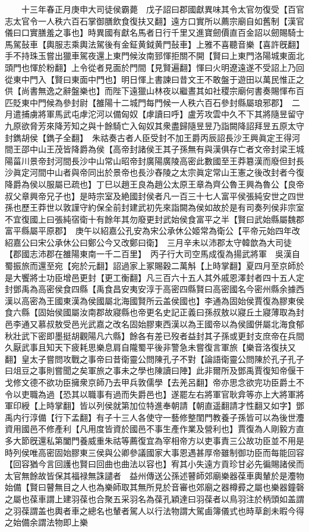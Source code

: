 　　十三年春正月庚申大司徒侯霸薨　戊子詔曰郡國獻異味其令太官勿復受【百官志太官令一人秩六百石掌御膳飲食復扶又翻】遠方口實所以薦宗廟自如舊制【漢官儀曰口實膳羞之事也】時異國有獻名馬者日行千里又進寶劒價直百金詔以劒賜騎士馬駕鼔車【輿服志乘輿法駕後有金鉦黄鉞黄門鼔車】上雅不喜聽音樂【喜許旣翻】手不持珠玉嘗出獵車駕夜還上東門候汝南郅惲拒關不開【賢曰上東門洛陽城東面北頭門也惲於粉翻】上令從者見面於門間【見賢遍翻】惲曰火明遼遠遂不受詔上乃回從東中門入【賢曰東面中門也】明日惲上書諫曰昔文王不敢盤于遊田以萬民惟正之供【尚書無逸之辭盤樂也】而陛下遠獵山林夜以繼晝其如社稷宗廟何書奏賜惲布百匹貶東中門候為參封尉【雒陽十二城門每門候一人秩六百石參封縣屬琅邪郡】　二月遣捕虜將軍馬武屯虖沱河以備匈奴【虖讀曰呼】盧芳攻雲中久不下其將隨昱留守九原欲脅芳來降芳知之與十餘騎亡入匈奴其衆盡歸隨昱昱乃詣闕降詔拜昱五原太守封鐫胡侯【鐫子全翻】　朱祜奏古者人臣受封不加王爵丙辰詔長沙王興眞定王得河間王邵中山王茂皆降爵為侯【高帝封諸侯王其子孫無有與漢俱存亡者文帝封梁王城陽菑川景帝封河間長沙中山常山昭帝封廣陽廣陵高密此數國至王莽簒漢而廢但封長沙眞定河間中山者與帝同出於景帝也長沙舂陵之太宗眞定常山王憲之後改封者今復降爵為侯以服屬已疏也】丁巳以趙王良為趙公太原王章為齊公魯王興為魯公【良帝叔父章興帝兄子也】是時宗室及絶國封侯者凡一百三十七人富平侯張純安世之四世孫也歷王莽世以敦謹守約保全前封建武初先來詣闕為侯如故於是有司奏列侯非宗室不宜復國上曰張純宿衛十有餘年其勿廢更封武始侯食富平之半【賢曰武始縣屬魏郡富平縣屬平原郡】　庚午以紹嘉公孔安為宋公承休公姬常為衛公【平帝元始四年改紹嘉公曰宋公承休公曰鄭公今又改鄭曰衛】　三月辛未以沛郡太守韓歆為大司徒【郡國志沛郡在雒陽東南一千二百里】　丙子行大司空馬成復為揚武將軍　吳漢自蜀振旅而還至宛【宛於元翻】詔過家上冢賜穀二萬斛【上時掌翻】夏四月至京師於是大饗將士功臣增邑更封【更工衡翻】凡三百六十五人其外戚恩澤封者四十五人定封鄧禹為高密侯食四縣【禹食昌安夷安淳于高密四縣賢曰高密國名今密州縣余據西漢以高密為王國東漢為侯國屬北海國賢所云盖侯國也】李通為固始侯賈復為膠東侯食六縣【固始侯國屬汝南郡故寢縣也帝更名史記正義曰孫叔敖以寢丘土寢薄取為封邑李通又慕叔敖受邑光武嘉之改名固始膠東西漢以為王國帝以為侯國併屬北海食郁秋壯武下密即墨挺胡觀陽凡六縣】餘各有差已歿者益封其子孫或更封支庶帝在兵間久厭武事且知天下疲耗思樂息肩自隴蜀平後非警急未嘗復言軍旅【樂音洛復扶又翻】皇太子嘗問攻戰之事帝曰昔衛靈公問陳孔子不對【論語衛靈公問陳於孔子孔子曰俎豆之事則嘗聞之矣軍旅之事未之學也陳讀曰陣】此非爾所及鄧禹賈復知帝偃干戈修文德不欲功臣擁衆京師乃去甲兵敦儒學【去羌呂翻】帝亦思念欲完功臣爵土不令以吏職為過【恐其以職事有過而失爵邑也】遂罷左右將軍官耿弇等亦上大將軍將軍印綬【上時掌翻】皆以列侯就第加位特進奉朝請【朝直遥翻請才性翻又如字】鄧禹内行淳備【行下孟翻】有子十三人各使守一藝修整閨門教養子孫皆可以為後世灋資用國邑不修產利【凡用度皆資於國邑不事生產作業及營利也】賈復為人剛毅方直多大節旣還私第闔門養威重朱祜等薦復宜為宰相帝方以吏事責三公故功臣並不用是時列侯唯高密固始膠東三侯與公卿參議國家大事恩遇甚厚帝雖制御功臣而每能回容【回容猶今言回護也賢曰回曲也曲法以容也】宥其小失遠方貢珍甘必先徧賜諸侯而太官無餘故皆保其福禄無誅譴者　益州傳送公孫述瞽師郊廟樂器葆車輿輦於是灋物始備【賢曰瞽無目之人也為樂師取其無所見於音審也郊廟之器樽彛之屬也樂器鐘磬之屬也葆車謂上建羽葆也合聚五采羽名為葆孔穎達曰羽葆者以鳥羽注於柄頭如盖謂之羽葆謂盖也輿者車之總名也輦者駕人以行法物謂大駕鹵簿儀式也時草創未暇今得之始備余謂法物即上樂